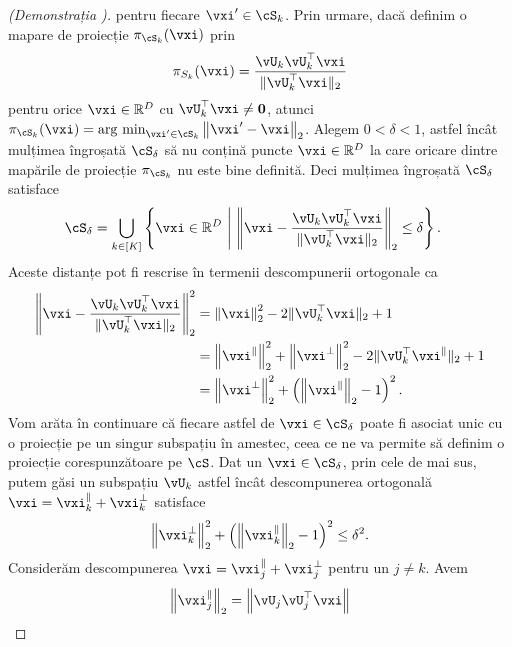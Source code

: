 \documentclass[../../book-main_ro.tex]{subfiles}
\begin{document}
\begin{proof}[(Demonstrația )]
    pentru fiecare $\vxi' \in \cS_k$.
    Prin urmare, dacă definim o mapare de proiecție
    $\pi_{\cS_k}(\vxi)$
    prin
    \begin{equation}
        \pi_{S_k}(\vxi) = \frac{\vU_k\vU_k^\top \vxi}{\norm{\vU_k^\top \vxi}_2}
    \end{equation}
    pentru orice $\vxi \in \R^D$ cu $\vU_k^\top \vxi \neq \mathbf{0}$, atunci
    $\pi_{\cS_k}(\vxi) = \argmin_{\vxi' \in \cS_k}\norm*{\vxi' - \vxi}_2$.
    Alegem $0 < \delta < 1$, astfel încât mulțimea îngroșată $\cS_{\delta}$
    să nu conțină puncte $\vxi \in \R^D$ la care oricare dintre mapările de proiecție
    $\pi_{\cS_k}$ nu este bine definită.
    Deci mulțimea îngroșată $\cS_{\delta}$ satisface
    \begin{align}
        \cS_{\delta} 
        &= \bigcup_{k \in [K]} \set*{\vxi \in \R^D \given 
        \norm*{\vxi - \frac{\vU_k\vU_k^\top \vxi}{\norm{\vU_k^\top \vxi}_2}}_2
        \leq \delta}.
    \end{align}
    Aceste distanțe pot fi rescrise în termenii descompunerii ortogonale ca
    \begin{align}
        \norm*{\vxi - \frac{\vU_k\vU_k^\top \vxi}{\norm{\vU_k^\top \vxi}_2}}_2^2
        &=
        \norm*{\vxi}_2^2 - 2 \norm{\vU_k^\top \vxi}_2 + 1
        \\
        &=
        \norm*{\vxi^{\|}}_2^2 
        + \norm*{\vxi^{\perp}}_2^2
        - 2 \norm{\vU_k^\top \vxi^{\|}}_2 + 1
        \\
        &=
        \norm*{\vxi^{\perp}}_2^2
        + \left( \norm*{\vxi^{\|}}_2 - 1 \right)^2.
        \label{eq:distance-to-hypersphere}
    \end{align}
    Vom arăta în continuare că fiecare astfel de $\vxi \in \cS_{\delta}$ poate fi
    asociat unic cu o proiecție pe un singur subspațiu în amestec,
    ceea ce ne va permite să definim o proiecție corespunzătoare pe $\cS$.
    Dat un $\vxi \in \cS_{\delta}$, prin cele de mai sus, putem găsi un subspațiu
    $\vU_k$ astfel încât descompunerea ortogonală $\vxi = \vxi^{\|}_k
    + \vxi^{\perp}_k$ satisface
    \begin{equation}
        \norm*{\vxi^{\perp}_k}_2^2
        + \left( \norm*{\vxi^{\|}_k}_2 - 1 \right)^2
        \leq
        \delta^2.
    \end{equation}
    Considerăm descompunerea $\vxi = \vxi_j^{\|} + \vxi_j^{\perp}$ pentru un $j
    \neq k$. Avem
    \begin{align}
        \norm*{\vxi_j^{\|}}_2
        =
        \norm*{
            \vU_j \vU_j^\top \vxi 
}
\end{align}
\end{proof}
\end{document}
